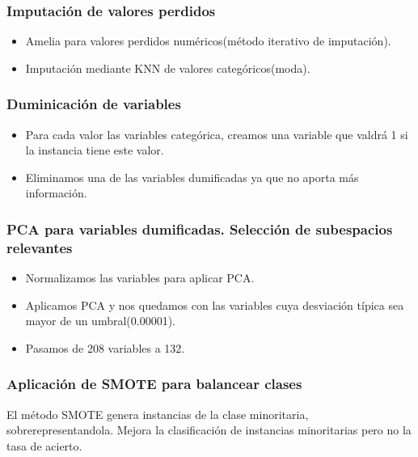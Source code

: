 \begin{frame}

\frametitle{Imputación de valores perdidos}

\begin{itemize}
	\item Amelia para valores perdidos numéricos(método iterativo de imputación).
	
	\item Imputación mediante KNN de valores categóricos(moda).
	
\end{itemize}

\end{frame}


\begin{frame}
\frametitle{Duminicación de variables}

\begin{itemize}
	\item Para cada valor las variables categórica, creamos una variable que valdrá 1 si la instancia tiene este valor.
	\item Eliminamos una de las variables dumificadas ya que no aporta más información.
\end{itemize}

\end{frame}

\begin{frame}
\frametitle{PCA para variables dumificadas. Selección de subespacios relevantes}

\begin{itemize}
	\item Normalizamos las variables para aplicar PCA.
	\item Aplicamos PCA y nos quedamos con las variables cuya desviación típica sea mayor de un umbral(0.00001).
	\item Pasamos de 208 variables a 132.
\end{itemize}
\end{frame}

\begin{frame}
\frametitle{Aplicación de SMOTE para balancear clases}

El método SMOTE genera instancias de la clase minoritaria, sobrerepresentandola. Mejora la clasificación de instancias minoritarias pero no la tasa de acierto.

\end{frame}

